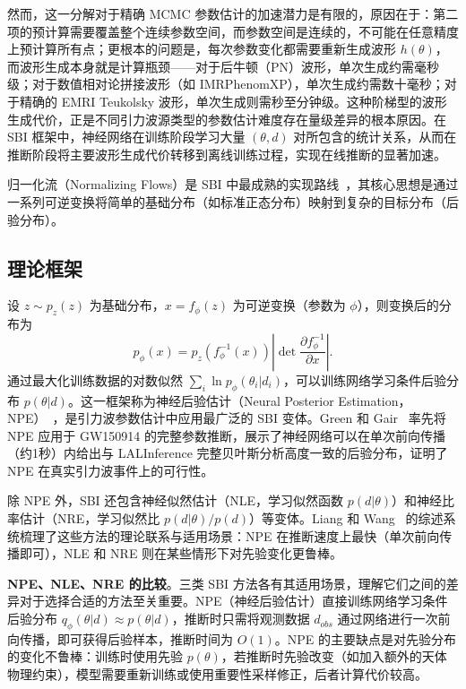 然而，这一分解对于精确 MCMC 参数估计的加速潜力是有限的，原因在于：第二项的预计算需要覆盖整个连续参数空间，而参数空间是连续的，不可能在任意精度上预计算所有点；更根本的问题是，每次参数变化都需要重新生成波形 $h(\theta)$，而波形生成本身就是计算瓶颈——对于后牛顿（PN）波形，单次生成约需毫秒级；对于数值相对论拼接波形（如 IMRPhenomXP），单次生成约需数十毫秒；对于精确的 EMRI Teukolsky 波形，单次生成则需秒至分钟级。这种阶梯型的波形生成代价，正是不同引力波源类型的参数估计难度存在量级差异的根本原因。在 SBI 框架中，神经网络在训练阶段学习大量 $(\theta, d)$ 对所包含的统计关系，从而在推断阶段将主要波形生成代价转移到离线训练过程，实现在线推断的显著加速。

归一化流（Normalizing Flows）是 SBI 中最成熟的实现路线~\cite{Papamakarios2021NF,Rezende2015NF}，其核心思想是通过一系列可逆变换将简单的基础分布（如标准正态分布）映射到复杂的目标分布（后验分布）。

\subsection{理论框架}

设 $z \sim p_z(z)$ 为基础分布，$x = f_\phi(z)$ 为可逆变换（参数为 $\phi$），则变换后的分布为
\begin{equation}
  p_\phi(x) = p_z(f_\phi^{-1}(x))\left|\det\frac{\partial f_\phi^{-1}}{\partial x}\right|.
\end{equation}
通过最大化训练数据的对数似然 $\sum_i \ln p_\phi(\theta_i | d_i)$，可以训练网络学习条件后验分布 $p(\theta|d)$。这一框架称为神经后验估计（Neural Posterior Estimation，NPE）~\cite{Dax2021RNPE,Dax2023NPPE}，是引力波参数估计中应用最广泛的 SBI 变体。Green 和 Gair~\cite{Green2021CVAE} 率先将 NPE 应用于 GW150914 的完整参数推断，展示了神经网络可以在单次前向传播（约1秒）内给出与 LALInference 完整贝叶斯分析高度一致的后验分布，证明了 NPE 在真实引力波事件上的可行性。

除 NPE 外，SBI 还包含神经似然估计（NLE，学习似然函数 $p(d|\theta)$）和神经比率估计（NRE，学习似然比 $p(d|\theta)/p(d)$）等变体。Liang 和 Wang~\cite{liang2026sbireview} 的综述系统梳理了这些方法的理论联系与适用场景：NPE 在推断速度上最快（单次前向传播即可），NLE 和 NRE 则在某些情形下对先验变化更鲁棒。

\textbf{NPE、NLE、NRE 的比较}。三类 SBI 方法各有其适用场景，理解它们之间的差异对于选择合适的方法至关重要。NPE（神经后验估计）直接训练网络学习条件后验分布 $q_\phi(\theta|d) \approx p(\theta|d)$，推断时只需将观测数据 $d_{obs}$ 通过网络进行一次前向传播，即可获得后验样本，推断时间为 $O(1)$。NPE 的主要缺点是对先验分布的变化不鲁棒：训练时使用先验 $p(\theta)$，若推断时先验改变（如加入额外的天体物理约束），模型需要重新训练或使用重要性采样修正，后者计算代价较高。

